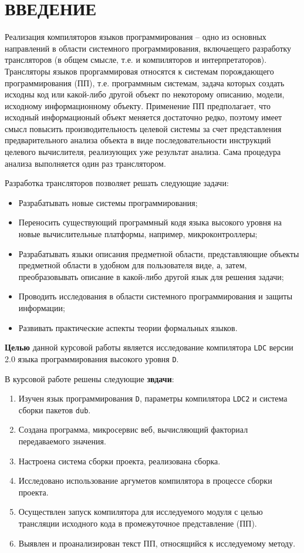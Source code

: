 \documentclass{studrep}
\begin{document}
\tableofcontents

\chapter*{ВВЕДЕНИЕ}
\label{chap:intro}

Реализация компиляторов языков программирования -- одно из основных направлений в области системного программирования, включаещего разработку трансляторов (в общем смысле, т.е. и компиляторов и интерпретаторов).  Трансляторы языков проргаммировая относятся к системам порождающего программирования (ПП), т.е. программным системам, задача которых создать исходны код или какой-либо другой объект по некоторому описанию, модели, исходному информационному объекту.  Применение ПП предполагает, что исходный информационый объект меняется достаточно редко, поэтому имеет смысл повысить производительность целевой системы за счет представления предварительного анализа объекта в виде последовательности инструкций целевого вычислителя, реализующих уже результат анализа.  Сама процедура анализа выполняется один раз транслятором.

Разработка трансляторов позволяет решать следующие задачи:
\begin{itemize}
\item Разрабатывать новые системы программирования;
\item Переносить существующий программный кодя языка высокого уровня на новые вычислительные платформы, например, микроконтроллеры;
\item Разрабатывать языки описания предметной области, представляющие объекты предметной области в удобном для пользователя виде, а, затем, преобразовывать описание в какой-либо другой язык для решения задачи;
\item Проводить исследования в области системного программирования и защиты информации;
\item Развивать практические аспекты теории формальных языков.
\end{itemize}

\textbf{Целью} данной курсовой работы является исследование компилятора \verb|LDC| версии 2.0 языка программирования высокого уровня \verb|D|.

В курсовой работе решены следующие \textbf{звдачи}:
\begin{enumerate}
\item Изучен язык программирования \verb|D|, параметры компилятора \verb|LDC2| и система сборки пакетов \verb|dub|.
\item Создана программа, микросервис веб, вычисляющий факториал передаваемого значения.
\item Настроена система сборки проекта, реализована сборка.
\item Исследовано использование аргуметов компилятора в процессе сборки проекта.
\item Осуществлен запуск компилятора для исследуемого модуля с целью трансляции исходного кода в промежуточное представление (ПП).
\item Выявлен и проанализирован текст ПП, относящийся к исследуемому методу.
\end{enumerate}
\end{document}
